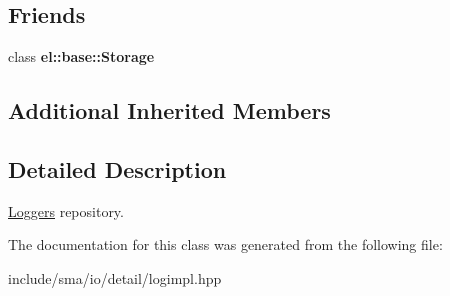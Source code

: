 \subsection*{Friends}
\begin{DoxyCompactItemize}
\item 
\hypertarget{classel_1_1base_1_1RegisteredLoggers_acc1efd1b8a3fc5e0028dab98b02e550a}{class {\bfseries el\-::base\-::\-Storage}}\label{classel_1_1base_1_1RegisteredLoggers_acc1efd1b8a3fc5e0028dab98b02e550a}

\end{DoxyCompactItemize}
\subsection*{Additional Inherited Members}


\subsection{Detailed Description}
\hyperlink{classel_1_1Loggers}{Loggers} repository. 

The documentation for this class was generated from the following file\-:\begin{DoxyCompactItemize}
\item 
include/sma/io/detail/logimpl.\-hpp\end{DoxyCompactItemize}

